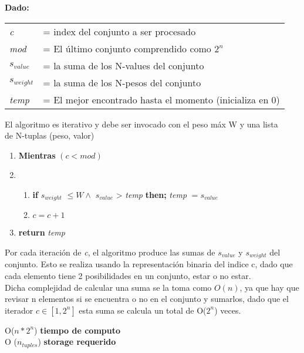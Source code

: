 \documentclass[fleqn, 11pt]{article}
\begin{document}
\textbf{Dado:}

\begin{tabular}{l l}
    \textit{c} & = index del conjunto a ser procesado \\
    \textit{mod} & = El último conjunto comprendido como $2^n$ \\
    \textit{$s_{value}$} & = la suma de los N-values del conjunto \\
    \textit{$s_{weight}$} & = la suma de los N-pesos del conjunto \\
    \textit{temp} & = El mejor encontrado hasta el momento (inicializa en 0) \\
\end{tabular}


El algoritmo es iterativo y debe ser invocado con el peso máx W  y una lista \\ de N-tuplas (peso, valor)

\begin{enumerate}
	\item \textbf{Mientras} $(c < mod)$

	\item   \begin{enumerate}
	             \item \textbf{if} \quad \textit{$s_{weight}$} $\le  W \land$ \textit{$s_{value}$}  > \textit{temp}  \quad \textbf{then; } \textit{temp} $ = s_{value} $
	             \item $c = c + 1$
	        \end{enumerate}

    \item \textbf{return} \textit{temp}
\end{enumerate}



Por cada iteración de \textit{c}, el algoritmo produce las sumas de \textit{$s_{value}$} y \textit{$s_{weight}$} del conjunto. Esto se realiza usando la representación binaria del indice c, dado que cada elemento tiene 2 posibilidades en un conjunto, estar o no estar. \\

Dicha complejidad de calcular una suma se la toma como $O(n)$, ya que hay que revisar n elementos si se encuentra o no en el conjunto y sumarlos, dado que el iterador $c \in [1,2^n]$ esta suma se calcula un total de O($2^n$) veces.

\small O($n * 2^n$) \textbf{tiempo de computo}  \\
\small O ($n_{tuples}$) \textbf{storage requerido} \\
\end{document}
